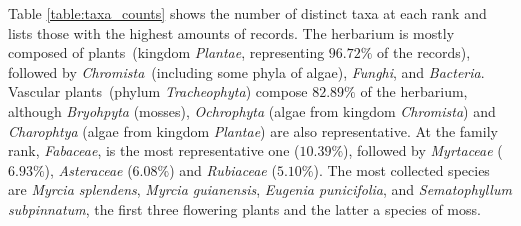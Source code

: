 Table \ref{table:taxa_counts} shows the number of distinct taxa at each rank and lists those with the highest amounts of records.
The herbarium is mostly composed of plants~(kingdom \textit{Plantae}, representing $96.72\%$ of the records), followed by \textit{Chromista}~(including some phyla of algae), \textit{Funghi}, and \textit{Bacteria}.
Vascular plants~(phylum \textit{Tracheophyta}) compose $82.89\%$ of the herbarium, although \textit{Bryohpyta} (mosses), \textit{Ochrophyta} (algae from kingdom \textit{Chromista}) and \textit{Charophtya} (algae from kingdom \textit{Plantae}) are also representative.
At the family rank, \textit{Fabaceae}, is the most representative one ($10.39\%$), followed by \textit{Myrtaceae} ($6.93\%$), \textit{Asteraceae} ($6.08\%$) and \textit{Rubiaceae} ($5.10\%$). 
The most collected species are \textit{Myrcia splendens}, \textit{Myrcia guianensis}, \textit{Eugenia punicifolia}, and \textit{Sematophyllum subpinnatum}, the first three flowering plants and the latter a species of moss.


